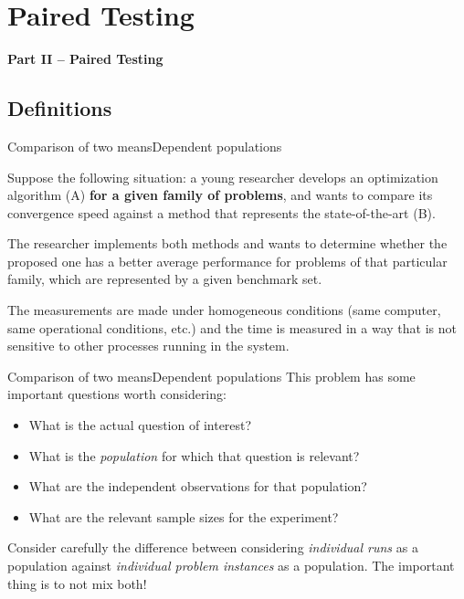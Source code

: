 \section{Paired Testing}
\begin{frame}
  \begin{center}
  {\bf Part II -- Paired Testing}
  \end{center}
\end{frame}

\subsection{Definitions}
\begin{frame}{Comparison of two means}{Dependent populations}

Suppose the following situation: a young researcher develops an optimization algorithm (A) {\bf for a given family of problems}, and wants to compare its convergence speed against a method that represents the state-of-the-art (B).
\bigskip

The researcher implements both methods and wants to determine whether the proposed one has a better average performance for problems of that particular family, which are represented by a given benchmark set.
\bigskip

The measurements are made under homogeneous conditions (same computer, same operational conditions, etc.) and the time is measured in a way that is not sensitive to other processes running in the system.
\end{frame}


\begin{frame}{Comparison of two means}{Dependent populations}
This problem has some important questions worth considering:
\bigskip

\begin{itemize}
  \item  What is the actual question of interest?
  \item What is the \textit{population} for which that question is relevant?
  \item What are the independent observations for that population?
  \item What are the relevant sample sizes for the experiment?
\end{itemize}
\bigskip

\begin{block}{}
  Consider carefully the difference between considering \emph{individual runs} as a population against \emph{individual problem instances} as a population. The important thing is to not mix both!
\end{block}
\end{frame}

